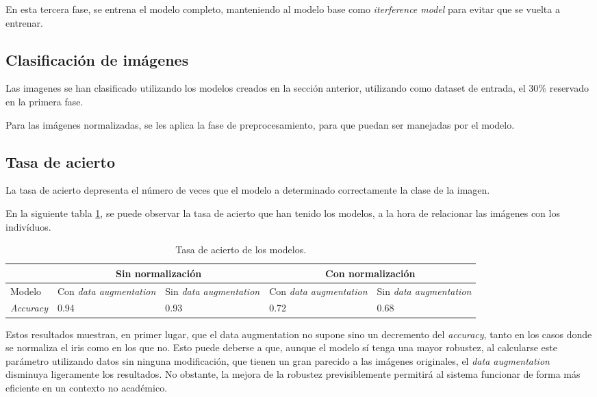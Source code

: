 En esta tercera fase, se entrena el modelo completo, manteniendo al modelo base como \textit{iterference model} para evitar que se vuelta a entrenar.


\subsection{Clasificación de imágenes}

Las imagenes se han clasificado utilizando los modelos creados en la sección anterior, utilizando como dataset de entrada, el 30\% reservado en la primera fase. 

Para las imágenes normalizadas, se les aplica la fase de preprocesamiento, para que puedan ser manejadas por el modelo. 

\subsection{Tasa de acierto} 

La tasa de acierto depresenta el número de veces que el modelo a determinado correctamente la clase de la imagen. 

En la siguiente tabla \ref{tabla:tasa-acierto-modelos}, se puede observar la tasa de acierto que han tenido los modelos, a la hora de relacionar las imágenes
 con los indivíduos.

\begin{table}[h!]
\begin{tabular}{ |p{2cm}||p{2cm}|p{2cm}|p{2cm}|p{2cm}|  }
    \hline
     & \multicolumn{2}{|c|}{Sin normalización} & \multicolumn{2}{|c|}{Con normalización} \\
    \hline
    Modelo& Con \textit{data augmentation} & Sin \textit{data augmentation} &Con \textit{data augmentation}&Sin \textit{data augmentation}\\
    \hline
    \textit{Accuracy} & 0.94   & 0.93    & 0.72 &   0.68\\
    \hline
   \end{tabular}
   \caption{\label{tabla:tasa-acierto-modelos}Tasa de acierto de los modelos.}
\end{table}


Estos resultados muestran, en primer lugar, que el data augmentation no supone sino un decremento del \textit{accuracy}, tanto en los casos donde se normaliza el iris
como en los que no. Esto puede deberse a que, aunque el modelo sí tenga una mayor robustez, al calcularse este parámetro utilizando datos sin ninguna modificación, que 
tienen un gran parecido a las imágenes originales, el \textit{data augmentation} disminuya ligeramente los resultados. No obstante, la mejora de la robustez previsiblemente
permitirá al sistema funcionar de forma más eficiente en un contexto no académico.


